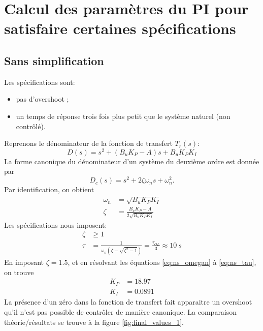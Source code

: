 \documentclass[frenchb, paper=a4, fontsize=11pt]{scrartcl}
\numberwithin{equation}{section}					%
\numberwithin{figure}{section}					%
\numberwithin{table}{section}						%
\begin{document}
\section{Calcul des paramètres du PI pour satisfaire certaines spécifications}

\subsection{Sans simplification}
Les spécifications sont:
\begin{itemize}
\item pas d'overshoot ;
\item un temps de réponse trois fois plus petit que le système naturel (non contrôlé).
\end{itemize}
Reprenons le dénominateur de la fonction de transfert $T_r(s)$:
\begin{equation}
	D(s) = s^2 +(B_u K_P -A)s + B_u K_P K_I
\end{equation}
La forme canonique du dénominateur d'un système du deuxième ordre
est donnée par
\begin{equation}
	D_c(s) = s^2 + 2\zeta \omega_n s + \omega_n^2.
\end{equation}
Par identification, on obtient
\begin{align}
	\omega_n 	&= \sqrt{B_u K_P K_I} \label{eq:ns_omegan}\\
	\zeta 		&= \frac{B_u K_P-A}{2\sqrt{B_u K_P K_I}}
\end{align}
Les spécifications nous imposent:
\begin{align}
	\zeta &\ge 1\\
	\tau & = \frac{1}{\omega_n(\zeta - \sqrt{\zeta^2-1})} = \frac{\tau_{OL}}{3}\approx \SI{10}{s} \label{eq:ns_tau}
\end{align}
En imposant $\zeta = 1.5$, et en résolvant les équations \ref{eq:ns_omegan} à \ref{eq:ns_tau},
on trouve
\begin{align}
	K_P &= 18.97\\
	K_I &= 0.0891
\end{align}
La présence d'un zéro dans la fonction de transfert fait apparaitre un overshoot
qu'il n'est pas possible de contrôler de manière canonique. 
La comparaison théorie/résultats se trouve à la figure \ref{fig:final_values_1}.
\end{document}
